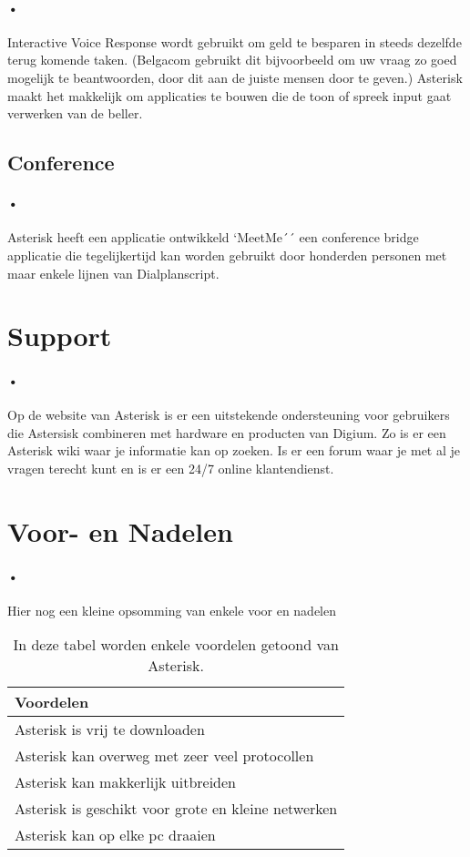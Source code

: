 \documentclass[12pt,a4paper]{report}
\begin{document}
\paragraph{•}
Interactive Voice Response wordt gebruikt om geld te besparen in steeds dezelfde terug komende taken. (Belgacom gebruikt dit bijvoorbeeld om uw vraag zo goed mogelijk te beantwoorden, door dit aan de juiste mensen door te geven.)  Asterisk maakt het makkelijk om applicaties te bouwen die de toon of spreek input gaat verwerken van de beller.

\subsection{Conference}
\paragraph{•}
Asterisk heeft een applicatie ontwikkeld ‘MeetMe´´ een conference bridge applicatie die tegelijkertijd kan worden gebruikt door honderden personen met maar enkele lijnen van Dialplanscript. 

\section{Support}
\paragraph{•}
Op de website van Asterisk is er een uitstekende ondersteuning voor gebruikers die Astersisk combineren met hardware en producten van Digium.  Zo is er een Asterisk wiki waar je informatie kan op zoeken. Is er een forum waar je met al je vragen terecht kunt en is er een 24/7 online klantendienst.

\section{Voor- en Nadelen}
\paragraph{•}
Hier nog een kleine opsomming van enkele voor en nadelen
\begin{table} [h]
\begin{tabular}{ | l | }
  \hline
  Voordelen\\
  \hline
  Asterisk is vrij te downloaden\\
  Asterisk kan overweg met zeer veel protocollen\\
  Asterisk kan makkerlijk uitbreiden\\
  Asterisk is geschikt voor grote en kleine netwerken\\
  Asterisk kan op elke pc draaien\\
  \hline
\end{tabular}
\caption[Voordelen Asterisk]{In deze tabel worden enkele voordelen getoond van Asterisk.}
\end{table}
\end{document}
